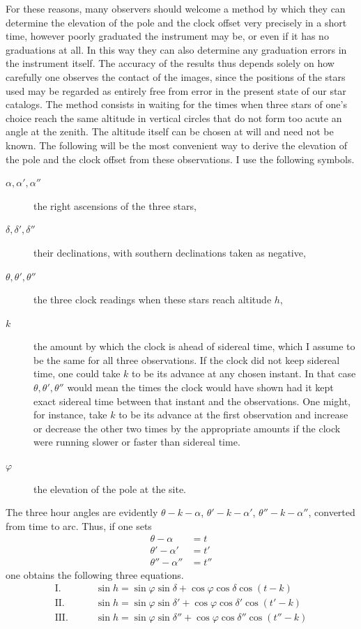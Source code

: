 For these reasons, many observers should welcome a method by which they can determine the elevation of the pole and the clock offset very precisely in a short time, however poorly graduated the instrument may be, or even if it has no graduations at all. In this way they can also determine any graduation errors in the instrument itself. The accuracy of the results thus depends solely on how carefully one observes the contact of the images, since the positions of the stars used may be regarded as entirely free from error in the present state of our star catalogs. The method consists in waiting for the times when three stars of one’s choice reach the same altitude in vertical circles that do not form too acute an angle at the zenith. The altitude itself can be chosen at will and need not
%
be known. The following will be the most convenient way to derive the elevation of the pole and the clock offset from these observations. I use the following symbols.
\begin{description}
\item[$\alpha,\alpha',\alpha''$] the right ascensions of the three stars,
\item[$\delta,\delta',\delta''$] their declinations, with southern declinations taken as negative,
\item[$\theta,\theta',\theta''$] the three clock readings when these stars reach altitude $h$,
\item[$k$] the amount by which the clock is ahead of sidereal time, which I assume to be the same for all three observations. If the clock did not keep sidereal time, one could take $k$ to be its advance at any chosen instant. In that case $\theta,\theta',\theta''$ would mean the times the clock would have shown had it kept exact sidereal time between that instant and the observations. One might, for instance, take $k$ to be its advance at the first observation and increase or decrease the other two times by the appropriate amounts if the clock were running slower or faster than sidereal time.
\item[$\varphi$] the elevation of the pole at the site.
\end{description}
The three hour angles are evidently $\theta-k-\alpha$, $\theta'-k-\alpha'$, $\theta''-k-\alpha''$, converted from time to arc. Thus, if one sets
\[
\begin{aligned}
\theta-\alpha&=t\\
\theta'-\alpha'&=t'\\
\theta''-\alpha''&=t''
\end{aligned}
\]
one obtains the following three equations.
\[
\begin{aligned}
\mathrm{I.}\qquad&\sin h=\sin\varphi\sin\delta+\cos\varphi\cos\delta\cos(t-k)\\
\mathrm{II.}\qquad&\sin h=\sin\varphi\sin\delta'+\cos\varphi\cos\delta'\cos(t'-k)\\
\mathrm{III.}\qquad&\sin h=\sin\varphi\sin\delta''+\cos\varphi\cos\delta''\cos(t''-k)
\end{aligned}
\]

